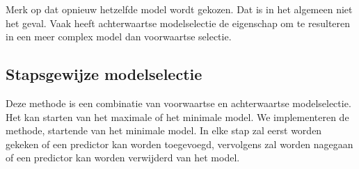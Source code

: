 \documentclass[12pt,dutch,coursenotes]{book}
\theoremstyle{definition}
\theoremstyle{definition}
\theoremstyle{definition}
\theoremstyle{remark}
\begin{document}
Merk op dat opnieuw hetzelfde model wordt gekozen. Dat is in het
algemeen niet het geval. Vaak heeft achterwaartse modelselectie de
eigenschap om te resulteren in een meer complex model dan voorwaartse
selectie.

\subsection{Stapsgewijze
modelselectie}\label{stapsgewijze-modelselectie}

Deze methode is een combinatie van voorwaartse en achterwaartse
modelselectie. Het kan starten van het maximale of het minimale model.
We implementeren de methode, startende van het minimale model. In elke
stap zal eerst worden gekeken of een predictor kan worden toegevoegd,
vervolgens zal worden nagegaan of een predictor kan worden verwijderd
van het model.
\end{document}

